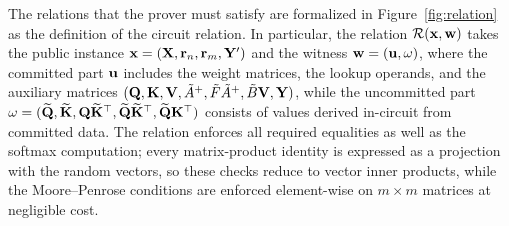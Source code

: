 \documentclass[runningheads]{llncs}
\begin{document}
The relations that the prover must satisfy are formalized in Figure~\ref{fig:relation} as the definition of the circuit relation. In particular, the relation ${\mathcal{R}}({\mathbf{x}},{\mathbf{w}})$ takes the public instance ${\mathbf{x}}=({\mathbf{X}},{\mathbf{r}}_n,{\mathbf{r}}_m, {\mathbf{Y}}')$ and the witness ${\mathbf{w}}=({\mathbf{u}}, {\mathbf{\omega}})$, where the committed part ${\mathbf{u}}$ includes the weight matrices, the lookup operands, and the auxiliary matrices $({\mathbf{Q}},{\mathbf{K}},{\mathbf{V}},\tilde{A}^{+},\tilde{F}\tilde{A}^{+},\tilde{B}{\mathbf{V}},{\mathbf{Y}})$, while the uncommitted part ${\mathbf{\omega}} = (\widetilde{{\mathbf{Q}}}, \widetilde{{\mathbf{K}}}, {\mathbf{Q}}\widetilde{{\mathbf{K}}}^{\top}, \widetilde{{\mathbf{Q}}}\widetilde{{\mathbf{K}}}^{\top}, \widetilde{{\mathbf{Q}}}{\mathbf{K}}^{\top})$ consists of values derived in-circuit from committed data. The relation enforces all required equalities as well as the softmax computation; every matrix-product identity is expressed as a projection with the random vectors, so these checks reduce to vector inner products, while the Moore--Penrose conditions are enforced element-wise on $m \times m$ matrices at negligible cost.
\end{document}
